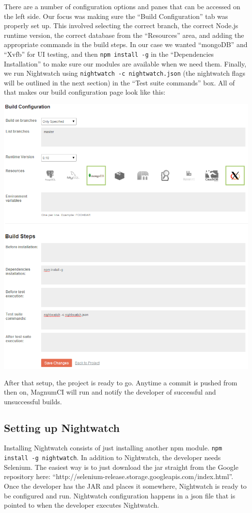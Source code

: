 \documentclass[12pt]{ucthesis}
\newenvironment{Figure}
  {\par\medskip\noindent\minipage{\linewidth}}
  {\endminipage\par\medskip}
\begin{document}
There are a number of configuration options and panes that can be accessed on the left side. Our focus was making sure the ``Build Configuration'' tab was properly set up. This involved selecting the correct branch, the correct Node.js runtime version, the correct database from the ``Resources'' area, and adding the appropriate commands in the build steps. In our case we wanted ``mongoDB'' and ``Xvfb'' for UI testing, and then \lstinline{npm install -g} in the ``Dependencies Installation'' to make sure our modules are available when we need them. Finally, we run Nightwatch using \lstinline{nightwatch -c nightwatch.json} (the nightwatch flags will be outlined in the next section) in the ``Test suite commands'' box. All of that makes our build configuration page look like this:
\begin{Figure}
  \centering
  \includegraphics[width=0.75\linewidth]{magnumCI_customize_build_filled.png}
\end{Figure}

After that setup, the project is ready to go. Anytime a commit is pushed from then on, MagnumCI will run and notify the developer of successful and unsuccessful builds.

\subsection{Setting up Nightwatch}
Installing Nightwatch consists of just installing another npm module. \lstinline{npm install -g nightwatch}. In addition to Nightwatch, the developer needs Selenium. The easiest way is to just download the jar straight from the Google repository here: ``http://selenium-release.storage.googleapis.com/index.html''. Once the developer has the JAR and places it somewhere, Nightwatch is ready to be configured and run. Nightwatch configuration happens in a json file that is pointed to when the developer executes Nightwatch. 
\end{document}
